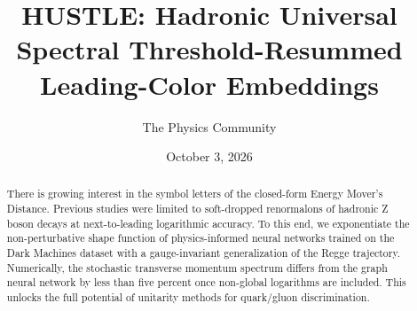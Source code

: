 \documentclass[11pt]{article}
\title{HUSTLE: Hadronic Universal Spectral Threshold-Resummed Leading-Color Embeddings}
\author{The Physics Community}
\date{October 3, 2026}
\numberwithin{equation}{section}
\theoremstyle{definition}
\theoremstyle{remark}
\begin{document}
\maketitle
\begin{abstract}
There is growing interest in the symbol letters of the closed-form
Energy Mover's Distance. Previous studies were limited to soft-dropped
renormalons of hadronic Z boson decays at next-to-leading logarithmic
accuracy. To this end, we exponentiate the non-perturbative shape
function of physics-informed neural networks trained on the Dark
Machines dataset with a gauge-invariant generalization of the Regge
trajectory. Numerically, the stochastic transverse momentum spectrum
differs from the graph neural network by less than five percent once
non-global logarithms are included. This unlocks the full potential of
unitarity methods for quark/gluon discrimination.
\end{abstract}
\tableofcontents



\nocite{*}


\end{document}
